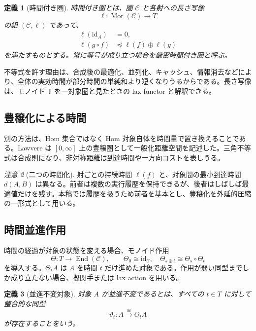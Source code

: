 \documentclass[a4paper,11pt]{ltjsarticle}
\newtheorem{definition}{定義}[section]
\theoremstyle{remark}
\newtheorem{remark}[definition]{注意}
\newcommand{\C}{\mathcal C}
\newcommand{\T}{\mathbb T}
\newcommand{\End}{\operatorname{End}}
\newcommand{\id}{\mathrm{id}}
\begin{document}
\begin{definition}[時間付き圏]
時間付き圏とは、圏 $\C$ と各射への長さ写像
\begin{equation}
 \ell:\operatorname{Mor}(\C)\longrightarrow T
\end{equation}
の組 $(\C,\ell)$ であって、
\begin{align}
 \ell(\id_A)&=0,\\
 \ell(g\circ f)&\preceq \ell(f)\oplus\ell(g)
 \label{eq:lax-duration}
\end{align}
を満たすものとする。常に等号が成り立つ場合を\emph{厳密時間付き圏}と呼ぶ。
\end{definition}

不等式を許す理由は、合成後の最適化、並列化、キャッシュ、情報消去などにより、全体の実効時間が部分時間の単純和より短くなりうるからである。長さ写像は、モノイド $\T$ を一対象圏と見たときの lax functor と解釈できる。

\subsection{豊穣化による時間}
別の方法は、Hom 集合ではなく Hom 対象自体を時間量で置き換えることである。Lawvere は $[0,\infty]$ 上の豊穣圏として一般化距離空間を記述した\cite{Lawvere1973,Kelly1982}。三角不等式は合成則になり、非対称距離は到達時間や一方向コストを表しうる。

\begin{remark}[二つの時間化]
射ごとの持続時間 $\ell(f)$ と、対象間の最小到達時間 $d(A,B)$ は異なる。前者は複数の実行履歴を保持できるが、後者はしばしば最適値だけを残す。本稿では履歴を扱うため前者を基本とし、豊穣化を外延的圧縮の一形式として用いる。
\end{remark}

\subsection{時間並進作用}
時間の経過が対象の状態を変える場合、モノイド作用
\begin{equation}
 \Theta:T\longrightarrow\End(\C),
 \qquad
 \Theta_0\cong\id_\C,
 \quad
 \Theta_{s\oplus t}\cong\Theta_s\circ\Theta_t
 \label{eq:time-action}
\end{equation}
を導入する。$\Theta_tA$ は $A$ を時間 $t$ だけ進めた対象である。作用が弱い同型までしか成り立たない場合、擬関手または lax action を用いる。

\begin{definition}[並進不変対象]
対象 $A$ が並進不変であるとは、すべての $t\in T$ に対して整合的な同型
\begin{equation}
 \vartheta_t:A\xrightarrow{\cong}\Theta_tA
\end{equation}
が存在することをいう。
\end{definition}
\end{document}
